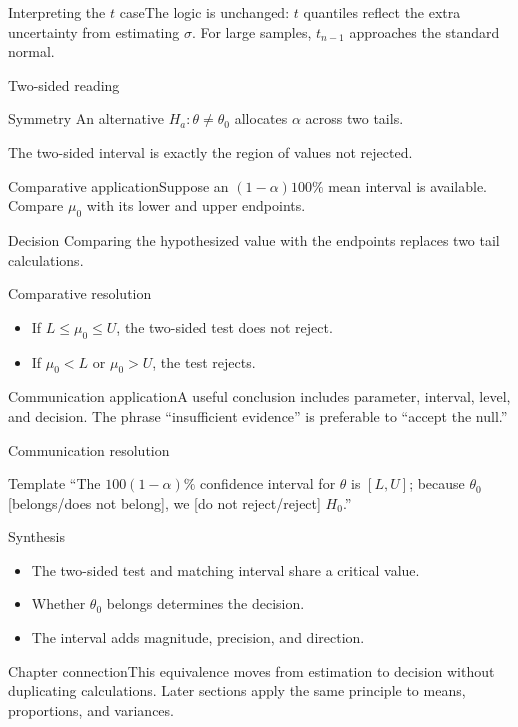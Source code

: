 \documentclass[10pt,aspectratio=169]{beamer}
\begin{document}
\begin{frame}{Interpreting the $t$ case}\small The logic is unchanged: $t$ quantiles reflect the extra uncertainty from estimating $\sigma$. For large samples, $t_{n-1}$ approaches the standard normal.\end{frame}
\begin{frame}{Two-sided reading}\small\begin{block}{Symmetry} An alternative $H_a:\theta\neq\theta_0$ allocates $\alpha$ across two tails.\end{block} The two-sided interval is exactly the region of values not rejected.\end{frame}
\begin{frame}{Comparative application}\small Suppose an $(1-\alpha)100\%$ mean interval is available. Compare $\mu_0$ with its lower and upper endpoints.
\begin{block}{Decision} Comparing the hypothesized value with the endpoints replaces two tail calculations.\end{block}\end{frame}
\begin{frame}{Comparative resolution}\small\begin{itemize}\item If $L\leq\mu_0\leq U$, the two-sided test does not reject.\item If $\mu_0<L$ or $\mu_0>U$, the test rejects.\end{itemize}\end{frame}
\begin{frame}{Communication application}\small A useful conclusion includes parameter, interval, level, and decision. The phrase ``insufficient evidence'' is preferable to ``accept the null.''\end{frame}
\begin{frame}{Communication resolution}\small\begin{block}{Template} ``The $100(1-\alpha)\%$ confidence interval for $\theta$ is $[L,U]$; because $\theta_0$ [belongs/does not belong], we [do not reject/reject] $H_0$.''\end{block}\end{frame}
\begin{frame}{Synthesis}\small\begin{itemize}\item The two-sided test and matching interval share a critical value.\item Whether $\theta_0$ belongs determines the decision.\item The interval adds magnitude, precision, and direction.\end{itemize}\end{frame}
\begin{frame}{Chapter connection}\small This equivalence moves from estimation to decision without duplicating calculations. Later sections apply the same principle to means, proportions, and variances.\end{frame}
\end{document}
